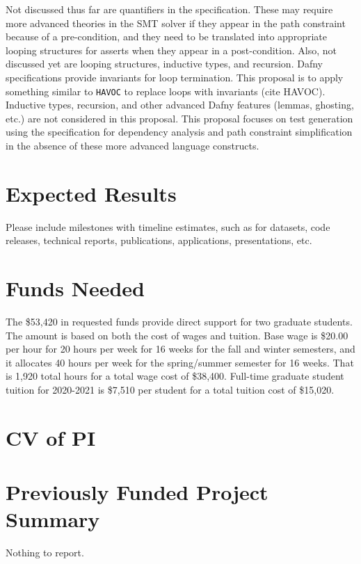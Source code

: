 \documentclass[11pt,onecolumn,notitlepage]{article}
\begin{document}
Not discussed thus far are quantifiers in the specification. These may require more advanced theories in the SMT solver if they appear in the path constraint because of a pre-condition, and they need to be translated into appropriate looping structures for asserts when they appear in a post-condition.  Also, not discussed yet are looping structures, inductive types, and recursion. Dafny specifications provide invariants for loop termination. This proposal is to apply something similar to \texttt{HAVOC} to replace loops with invariants (cite HAVOC). Inductive types, recursion, and other advanced Dafny features (lemmas, ghosting, etc.) are not considered in this proposal. This proposal focuses on test generation using the specification for dependency analysis and path constraint simplification in the absence of these more advanced language constructs.

\section*{Expected Results}
Please include milestones with timeline estimates, such as for datasets, code releases, technical reports, publications, applications, presentations, etc. 

\section*{Funds Needed}

The \$53,420 in requested funds provide direct support for two graduate students. The amount is based on both the cost of wages and tuition. Base wage is \$20.00 per hour for 20 hours per week for 16 weeks for the fall and winter semesters, and it allocates 40 hours per week for the spring/summer semester for 16 weeks. That is 1,920 total hours for a total wage cost of \$38,400. Full-time graduate student tuition for 2020-2021 is \$7,510 per student for a total tuition cost of \$15,020. 

\appendix
\appendixpage




\section{CV of PI}

\section{Previously Funded Project Summary}
Nothing to report.
\end{document}
